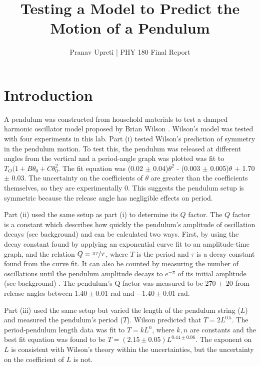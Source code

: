 \documentclass[notitlepage, twocolumn, 12pt]{article}
\title{Testing a Model to Predict the Motion of a Pendulum}
\author{Pranav Upreti | PHY 180 Final Report}
\begin{document}
    \maketitle

    \section*{Introduction}
    A pendulum was constructed from household materials to test a damped harmonic oscillator model proposed by Brian Wilson \cite{Wilson}. Wilson's model was tested with four experiments in this lab. Part (i) tested Wilson's prediction of symmetry in the pendulum motion. To test this, the pendulum was released at different angles from the vertical and a period-angle graph was plotted was fit to $T_O(1+B\theta_0+C\theta_0^2$. The fit equation was (0.02 $\pm$ 0.04)$\theta^2$ - (0.003 $\pm$ 0.005)$\theta$ + 1.70 $\pm$ 0.03. The uncertainty on the coefficients of $\theta$ are greater than the coefficients themselves, so they are experimentally 0. This suggests the pendulum setup is symmetric because the release angle has negligible effects on period. 


    Part (ii) used the same setup as part (i) to determine its $Q$ factor. The $Q$ factor is a constant which describes how quickly the pendulum's amplitude of oscillation decays (see background) and can be calculated two ways. First, by using the decay constant found by applying an exponential curve fit to an amplitude-time graph, and the relation $Q=\nicefrac{\pi\tau}{T}$, where $T$ is the period and $\tau$ is a decay constant found from the curve fit. It can also be counted by measuring the number of oscillations until the pendulum amplitude decays to $e^{-\pi}$ of its initial amplitude (see background) \cite{Wilson}. The pendulum's Q factor was measured to be 270 $\pm$ 20 from release angles between $1.40 \pm 0.01$ rad and $-1.40 \pm 0.01$ rad.
    
    Part (iii) used the same setup but varied the length of the pendulum string ($L$) and measured the pendulum's period ($T$). Wilson predicted that $T = 2 L^{0.5}$. The period-pendulum length data was fit to $T =kL^n$, where $k,n$ are constants and the best fit equation was found to be $T = (2.15 \pm 0.05)L^{0.44 \pm 0.06}$. The exponent on $L$ is consistent with Wilson's theory within the uncertainties, but the uncertainty on the coefficient of $L$ is not. 
    
\end{document}
